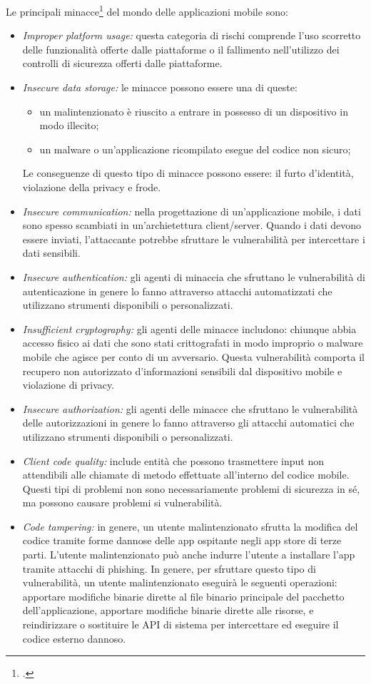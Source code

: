 Le principali minacce\footcite{site:owasp} del mondo delle applicazioni mobile sono:
\begin{itemize}
    \item \textit{Improper platform usage:} questa categoria di rischi comprende l'uso scorretto delle funzionalità offerte dalle piattaforme o il fallimento nell'utilizzo dei controlli di sicurezza offerti dalle piattaforme.
    \item \textit{Insecure data storage:} le minacce possono essere una di queste:
    \begin{itemize}
        \item un malintenzionato è riuscito a entrare in possesso di un dispositivo in modo illecito;
        \item un malware o un'applicazione ricompilato esegue del codice non sicuro;
    \end{itemize}
    Le conseguenze di questo tipo di minacce possono essere: il furto d'identità, violazione della privacy e frode.
    \item \textit{Insecure communication:}
    nella progettazione di un'applicazione mobile, i dati sono spesso scambiati in un'archietettura client/server.
    Quando i dati devono essere inviati, l'attaccante potrebbe sfruttare le vulnerabilità per intercettare i dati sensibili.
    \item \textit{Insecure authentication:}
    gli agenti di minaccia che sfruttano le vulnerabilità di autenticazione in genere lo fanno attraverso attacchi automatizzati che utilizzano strumenti disponibili o personalizzati.
    \item \textit{Insufficient cryptography:} gli agenti delle minacce includono: chiunque abbia accesso fisico ai dati che sono stati crittografati in modo improprio o malware mobile che agisce per conto di un avversario.
    Questa vulnerabilità comporta il recupero non autorizzato d'informazioni sensibili dal dispositivo mobile e violazione di privacy.
    \item \textit{Insecure authorization:}
    gli agenti delle minacce che sfruttano le vulnerabilità delle autorizzazioni in genere lo fanno attraverso gli attacchi automatici che utilizzano strumenti disponibili o personalizzati.
    \item \textit{Client code quality:} include entità che possono trasmettere input non attendibili alle chiamate di metodo effettuate all'interno del codice mobile. Questi tipi di problemi non sono necessariamente problemi di sicurezza in sé, ma possono causare problemi si vulnerabilità.
    \item \textit{Code tampering:}
    in genere, un utente malintenzionato sfrutta la modifica del codice tramite forme dannose delle app ospitante negli app store di terze parti.
    L'utente malintenzionato può anche indurre l'utente a installare l'app tramite attacchi di phishing. In genere, per sfruttare questo tipo di vulnerabilità, un utente malintenzionato eseguirà le seguenti operazioni: apportare modifiche binarie dirette al file binario principale del pacchetto dell'applicazione, apportare modifiche binarie dirette alle risorse, e reindirizzare o sostituire le API di sistema per intercettare ed eseguire il codice esterno dannoso.


\end{itemize}
